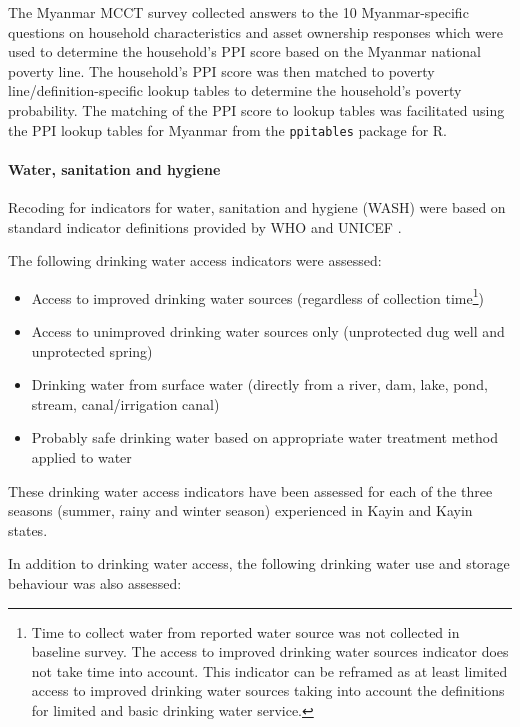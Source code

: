 \documentclass[12pt,a4paper]{article}
\let\oldparagraph\paragraph
\renewcommand{\paragraph}[1]{\oldparagraph{#1}\mbox{}}
\let\rmarkdownfootnote\footnote%
\def\footnote{\protect\rmarkdownfootnote}
\begin{document}
The Myanmar MCCT survey collected answers to the 10 Myanmar-specific questions on household characteristics and asset ownership responses which were used to determine the household's PPI score based on the Myanmar national poverty line. The household's PPI score was then matched to poverty line/definition-specific lookup tables to determine the household's poverty probability. The matching of the PPI score to lookup tables was facilitated using the PPI lookup tables for Myanmar from the \texttt{ppitables} package \citep{Guevarra2019} for R.

\hypertarget{wash}{%
\paragraph{Water, sanitation and hygiene}\label{wash}}

Recoding for indicators for water, sanitation and hygiene (WASH) were based on standard indicator definitions provided by WHO and UNICEF \citep{WHOUNICEFJointMonitoringProgrammeforWaterSupplyandSanitation:2018vr, WorldHealthOrganization:2006vv}.

The following drinking water access indicators were assessed:

\begin{itemize}
\item
  Access to improved drinking water sources (regardless of collection time\footnote{Time to collect water from reported water source was not collected in baseline survey. The access to improved drinking water sources indicator does not take time into account. This indicator can be reframed as at least limited access to improved drinking water sources taking into account the definitions for limited and basic drinking water service.})
\item
  Access to unimproved drinking water sources only (unprotected dug well and unprotected spring)
\item
  Drinking water from surface water (directly from a river, dam, lake, pond, stream, canal/irrigation canal)
\item
  Probably safe drinking water based on appropriate water treatment method applied to water
\end{itemize}

These drinking water access indicators have been assessed for each of the three seasons (summer, rainy and winter season) experienced in Kayin and Kayin states.

In addition to drinking water access, the following drinking water use and storage behaviour was also assessed:
\end{document}
